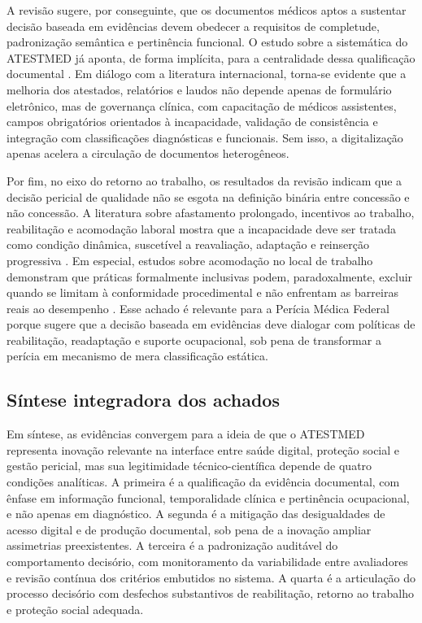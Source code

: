 \documentclass[12pt,a4paper]{article}
\begin{document}
A revisão sugere, por conseguinte, que os documentos médicos aptos a sustentar decisão baseada em evidências devem obedecer a requisitos de completude, padronização semântica e pertinência funcional. O estudo sobre a sistemática do ATESTMED já aponta, de forma implícita, para a centralidade dessa qualificação documental \parencite{soares20241031t0000000000asistematicadoatestmednaconcessa}. Em diálogo com a literatura internacional, torna-se evidente que a melhoria dos atestados, relatórios e laudos não depende apenas de formulário eletrônico, mas de governança clínica, com capacitação de médicos assistentes, campos obrigatórios orientados à incapacidade, validação de consistência e integração com classificações diagnósticas e funcionais. Sem isso, a digitalização apenas acelera a circulação de documentos heterogêneos.

Por fim, no eixo do retorno ao trabalho, os resultados da revisão indicam que a decisão pericial de qualidade não se esgota na definição binária entre concessão e não concessão. A literatura sobre afastamento prolongado, incentivos ao trabalho, reabilitação e acomodação laboral mostra que a incapacidade deve ser tratada como condição dinâmica, suscetível a reavaliação, adaptação e reinserção progressiva \parencite{gabbay2011niceguidanceonlongtermsicknessandincapacity, corden2001incapacitybenefitsandworkincentives, przysada2019anassessmentofworkabilityafterthecompletionofre, deveau2011workplaceaccommodationandauditbasedevaluationprocess}. Em especial, estudos sobre acomodação no local de trabalho demonstram que práticas formalmente inclusivas podem, paradoxalmente, excluir quando se limitam à conformidade procedimental e não enfrentam as barreiras reais ao desempenho \parencite{deveau2011workplaceaccommodationandauditbasedevaluationprocess}. Esse achado é relevante para a Perícia Médica Federal porque sugere que a decisão baseada em evidências deve dialogar com políticas de reabilitação, readaptação e suporte ocupacional, sob pena de transformar a perícia em mecanismo de mera classificação estática.

\subsection{Síntese integradora dos achados}
\label{sec:org359a145}

Em síntese, as evidências convergem para a ideia de que o ATESTMED representa inovação relevante na interface entre saúde digital, proteção social e gestão pericial, mas sua legitimidade técnico-científica depende de quatro condições analíticas. A primeira é a qualificação da evidência documental, com ênfase em informação funcional, temporalidade clínica e pertinência ocupacional, e não apenas em diagnóstico. A segunda é a mitigação das desigualdades de acesso digital e de produção documental, sob pena de a inovação ampliar assimetrias preexistentes. A terceira é a padronização auditável do comportamento decisório, com monitoramento da variabilidade entre avaliadores e revisão contínua dos critérios embutidos no sistema. A quarta é a articulação do processo decisório com desfechos substantivos de reabilitação, retorno ao trabalho e proteção social adequada.
\end{document}

